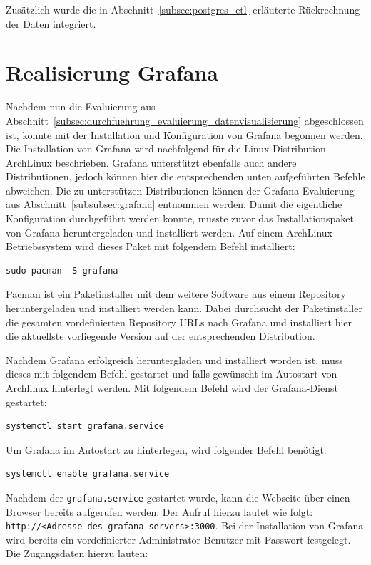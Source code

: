 Zusätzlich wurde die in Abschnitt~\ref{subsec:postgres_etl} erläuterte
Rückrechnung der Daten integriert.
\nl%

\section{Realisierung Grafana}
\label{sec:realisierung_grafana}
Nachdem nun die Evaluierung aus
Abschnitt~\ref{subsec:durchfuehrung_evaluierung_datenvisualisierung}
abgeschlossen ist, konnte mit der Installation und Konfiguration von Grafana
begonnen werden. Die Installation von Grafana wird nachfolgend für die Linux
Distribution ArchLinux beschrieben. Grafana unterstützt ebenfalls auch andere
Distributionen, jedoch können hier die entsprechenden unten aufgeführten
Befehle abweichen. Die zu unterstützen Distributionen können der Grafana
Evaluierung aus Abschnitt~\ref{subsubsec:grafana} entnommen werden. Damit die
eigentliche Konfiguration durchgeführt werden konnte, musste zuvor das
Installationspaket von Grafana heruntergeladen und installiert werden. Auf
einem ArchLinux\hyp{}Betriebssystem wird dieses Paket mit folgendem Befehl
installiert:

\begin{verbatim}
sudo pacman -S grafana
\end{verbatim}

Pacman ist ein Paketinstaller mit dem weitere Software aus einem
\gls{Repository} heruntergeladen und installiert werden kann. Dabei durchsucht
der Paketinstaller die gesamten vordefinierten \gls{Repository} URLs nach
Grafana und installiert hier die aktuellste vorliegende Version auf der
entsprechenden Distribution.

Nachdem Grafana erfolgreich heruntergladen und installiert worden ist, muss
dieses mit folgendem Befehl gestartet und falls gewünscht im Autostart von
Archlinux hinterlegt werden. Mit folgendem Befehl wird der Grafana\hyp{}Dienst
gestartet:

\begin{verbatim}
systemctl start grafana.service
\end{verbatim}

Um Grafana im Autostart zu hinterlegen, wird folgender Befehl benötigt:

\begin{verbatim}
systemctl enable grafana.service
\end{verbatim}

Nachdem der \texttt{grafana.service} gestartet wurde, kann die Webseite über
einen Browser bereits aufgerufen werden. Der Aufruf hierzu lautet wie folgt:
\texttt{http://<Adresse\hyp{}des\hyp{}grafana\hyp{}servers>:3000}. Bei der
Installation von Grafana wird bereits ein vordefinierter
Administrator\hyp{}Benutzer mit Passwort festgelegt. Die Zugangsdaten hierzu
lauten:

